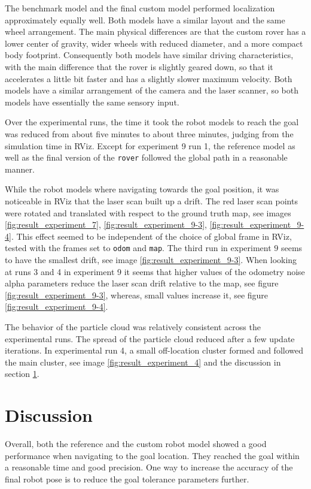 \documentclass[10pt,journal,compsoc]{IEEEtran}
\begin{document}
The benchmark model and the final custom model performed localization approximately equally well. Both models have a similar layout and the same wheel arrangement. The main physical differences are that the custom rover has a lower center of gravity, wider wheels with reduced diameter, and a more compact body footprint. Consequently both models have similar driving characteristics, with the main difference that the rover is slightly geared down, so that it accelerates a little bit faster and has a slightly slower maximum velocity. Both models have a similar arrangement of the camera and the laser scanner, so both models have essentially the same sensory input. 

Over the experimental runs, the time it took the robot models to reach the goal was reduced from about five minutes to about three minutes, judging from the simulation time in RViz. Except for experiment 9 run 1, the reference model as well as the final version of the \texttt{rover} followed the global path in a reasonable manner.

While the robot models where navigating towards the goal position, it was noticeable in RViz that the laser scan built up a drift. The red laser scan points were rotated and translated with respect to the ground truth map, see images \ref{fig:result_experiment_7}, \ref{fig:result_experiment_9-3}, \ref{fig:result_experiment_9-4}. This effect seemed to be independent of the choice of global frame in RViz, tested with the frames set to \texttt{odom} and \texttt{map}. The third run in experiment $9$ seems to have the smallest drift, see image \ref{fig:result_experiment_9-3}. When looking at runs 3 and 4 in experiment 9 it seems that higher values of the odometry noise alpha parameters reduce the laser scan drift relative to the map, see figure \ref{fig:result_experiment_9-3}, whereas, small values increase it, see figure \ref{fig:result_experiment_9-4}. 

The behavior of the particle cloud was relatively consistent across the experimental runs. The spread of the particle cloud reduced after a few update  iterations. In experimental run 4, a small off-location cluster formed and followed the main cluster, see image \ref{fig:result_experiment_4} and the discussion in section \ref{sec:discussion}.

\section{Discussion}
\label{sec:discussion}
Overall, both the reference and the custom robot model showed a good performance when navigating to the goal location. They reached the goal within a reasonable time and good precision. One way to increase the accuracy of the final robot pose is to reduce the goal tolerance parameters further.
\end{document}
